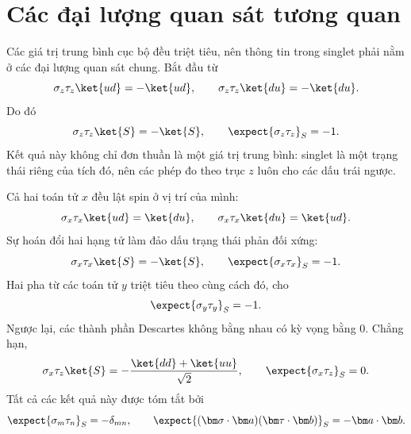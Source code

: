 \begin{classroomqa}
\end{classroomqa}

\section{Các đại lượng quan sát tương quan}

Các giá trị trung bình cục bộ đều triệt tiêu, nên thông tin trong singlet phải nằm ở các đại lượng quan sát chung. Bắt đầu từ
\begin{equation}
\sigma_z\tau_z\ket{ud}=-\ket{ud},
\qquad
\sigma_z\tau_z\ket{du}=-\ket{du}.
\end{equation}
Do đó
\begin{equation}
\sigma_z\tau_z\ket{S}=-\ket{S},
\qquad
\expect{\sigma_z\tau_z}_S=-1.
\label{eq:l6-zz-correlation}
\end{equation}
Kết quả này không chỉ đơn thuần là một giá trị trung bình: singlet là một trạng thái riêng của tích đó, nên các phép đo theo trục \(z\) luôn cho các dấu trái ngược.

Cả hai toán tử \(x\) đều lật spin ở vị trí của mình:
\begin{equation}
\sigma_x\tau_x\ket{ud}=\ket{du},
\qquad
\sigma_x\tau_x\ket{du}=\ket{ud}.
\end{equation}
Sự hoán đổi hai hạng tử làm đảo dấu trạng thái phản đối xứng:
\begin{equation}
\sigma_x\tau_x\ket{S}=-\ket{S},
\qquad
\expect{\sigma_x\tau_x}_S=-1.
\end{equation}
Hai pha từ các toán tử \(y\) triệt tiêu theo cùng cách đó, cho
\begin{equation}
\expect{\sigma_y\tau_y}_S=-1.
\end{equation}
Ngược lại, các thành phần Descartes không bằng nhau có kỳ vọng bằng 0. Chẳng hạn,
\begin{equation}
\sigma_x\tau_z\ket{S}
=-\frac{\ket{dd}+\ket{uu}}{\sqrt2},
\qquad
\expect{\sigma_x\tau_z}_S=0.
\end{equation}
Tất cả các kết quả này được tóm tắt bởi
\begin{equation}
\expect{\sigma_m\tau_n}_S=-\delta_{mn},
\qquad
\expect{(\bm\sigma\cdot\bm a)(\bm\tau\cdot\bm b)}_S
=-\bm a\cdot\bm b.
\label{eq:l6-singlet-correlation-tensor}
\end{equation}

